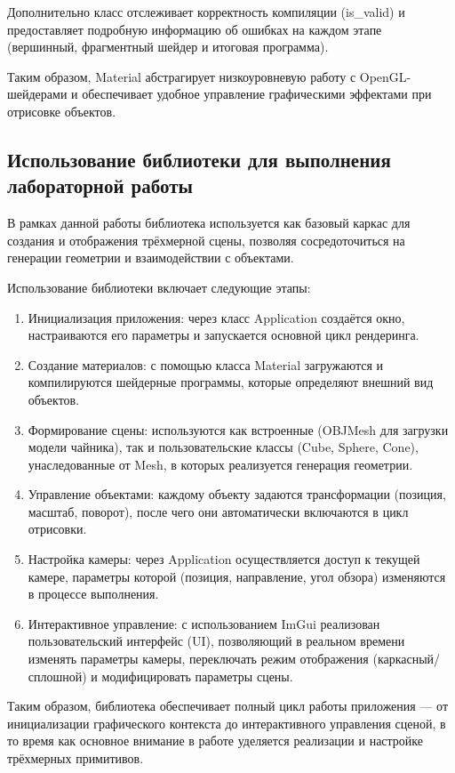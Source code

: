 \documentclass[a4paper,12pt]{article}
\begin{document}
Дополнительно класс отслеживает корректность компиляции (is\_valid) и предоставляет подробную информацию об ошибках на каждом этапе (вершинный, фрагментный шейдер и итоговая программа).

Таким образом, Material абстрагирует низкоуровневую работу с OpenGL-шейдерами и обеспечивает удобное управление графическими эффектами при отрисовке объектов.

\newpage

\subsection* {Использование библиотеки для выполнения лабораторной работы}
В рамках данной работы библиотека используется как базовый каркас для создания и отображения трёхмерной сцены, позволяя сосредоточиться на генерации геометрии и взаимодействии с объектами.

Использование библиотеки включает следующие этапы:

\begin{enumerate}
    \item Инициализация приложения: через класс Application создаётся окно, настраиваются его параметры и запускается основной цикл рендеринга.
    \item Создание материалов: с помощью класса Material загружаются и компилируются шейдерные программы, которые определяют внешний вид объектов.
    \item Формирование сцены: используются как встроенные (OBJMesh для загрузки модели чайника), так и пользовательские классы (Cube, Sphere, Cone), унаследованные от Mesh, в которых реализуется генерация геометрии.
    \item Управление объектами: каждому объекту задаются трансформации (позиция, масштаб, поворот), после чего они автоматически включаются в цикл отрисовки.
    \item Настройка камеры: через Application осуществляется доступ к текущей камере, параметры которой (позиция, направление, угол обзора) изменяются в процессе выполнения.
    \item Интерактивное управление: с использованием ImGui реализован пользовательский интерфейс (UI), позволяющий в реальном времени изменять параметры камеры, переключать режим отображения (каркасный/сплошной) и модифицировать параметры сцены.
\end{enumerate}

Таким образом, библиотека обеспечивает полный цикл работы приложения — от инициализации графического контекста до интерактивного управления сценой, в то время как основное внимание в работе уделяется реализации и настройке трёхмерных примитивов.
\newpage
\end{document}
